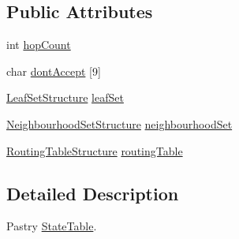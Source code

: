 \subsection*{Public Attributes}
\begin{DoxyCompactItemize}
\item 
int \hyperlink{structStateTable_ae516afd0b69c8a2b813729d60fec358d}{hop\-Count}
\item 
char \hyperlink{structStateTable_a9c09d0935258b0ac3f5675ccdc66dded}{dont\-Accept} \mbox{[}9\mbox{]}
\item 
\hyperlink{structLeafSetStructure}{Leaf\-Set\-Structure} \hyperlink{structStateTable_a1fc9c824d5a46581e41be343ed413a33}{leaf\-Set}
\item 
\hyperlink{structNeighbourhoodSetStructure}{Neighbourhood\-Set\-Structure} \hyperlink{structStateTable_a85564c6deec324c3db3263ca08263f63}{neighbourhood\-Set}
\item 
\hyperlink{structRoutingTableStructure}{Routing\-Table\-Structure} \hyperlink{structStateTable_a8ccc728c639db2384c4eed11a8f3d484}{routing\-Table}
\end{DoxyCompactItemize}


\subsection{Detailed Description}
Pastry \hyperlink{structStateTable}{State\-Table}. 

